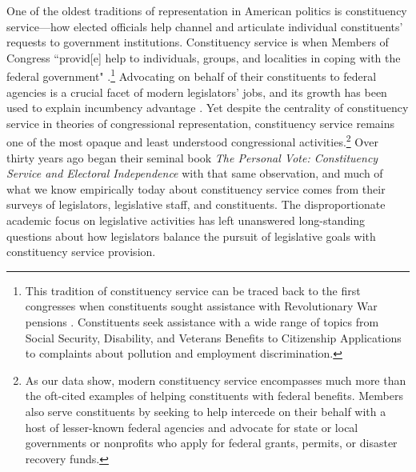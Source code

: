 \documentclass[12pt]{article}
\begin{document}
One of the oldest traditions of representation in American politics is constituency service---how elected officials help channel and articulate individual constituents' requests to government institutions. Constituency service is when Members of Congress ``provid[e] help to individuals, groups, and localities in coping with the federal government" \citep{Fenno1978}.\footnote{This tradition of constituency service can be traced back to the first congresses when constituents sought assistance with Revolutionary War pensions \citep{Eckman2017}. Constituents seek assistance with a wide range of topics from Social Security, Disability, and Veterans Benefits to Citizenship Applications to complaints about pollution and employment discrimination.} Advocating on behalf of their constituents to federal agencies is a crucial facet of modern legislators' jobs, and its growth has been used to explain incumbency advantage \citep{King1991}. Yet despite the centrality of constituency service in theories of congressional representation, constituency service remains one of the most opaque and least understood congressional activities.\footnote{As our data show, modern constituency service encompasses much more than the oft-cited examples of helping constituents with federal benefits. Members also serve constituents by seeking to help intercede on their behalf with a host of lesser-known federal agencies and advocate for state or local governments or nonprofits who apply for federal grants, permits, or disaster recovery funds.} Over thirty years ago \citet*{CainFerejohnFiorina1987} began their seminal book \emph{The Personal Vote: Constituency Service and Electoral Independence} with that same observation, and much of what we know empirically today about constituency service comes from their surveys of legislators, legislative staff, and constituents. The disproportionate academic focus on legislative activities has left unanswered long-standing questions about how legislators balance the pursuit of legislative goals with constituency service provision. 
\end{document}

